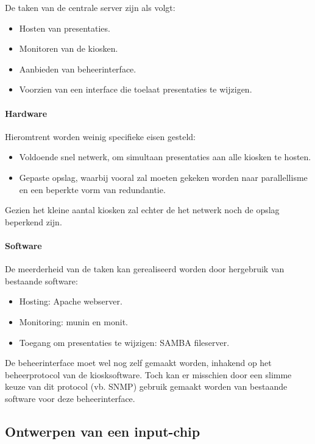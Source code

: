 \documentclass[a4paper,oneside,11pt,final]{memoir}
\begin{document}
De taken van de centrale server zijn als volgt:
\begin{itemize}
	\item Hosten van presentaties.
	\item Monitoren van de kiosken.
	\item Aanbieden van beheerinterface.
	\item Voorzien van een interface die toelaat presentaties te wijzigen.
\end{itemize}

\paragraph{Hardware} Hieromtrent worden weinig specifieke eisen gesteld:
\begin{itemize}
	\item Voldoende snel netwerk, om simultaan presentaties aan alle kiosken te hosten.
	\item Gepaste opslag, waarbij vooral zal moeten gekeken worden naar parallellisme en een beperkte vorm van redundantie.
\end{itemize}

Gezien het kleine aantal kiosken zal echter de het netwerk noch de opslag beperkend zijn.

\paragraph{Software} De meerderheid van de taken kan gerealiseerd worden door hergebruik van bestaande software:
\begin{itemize}
	\item Hosting: Apache webserver.
	\item Monitoring: munin en monit.
	\item Toegang om presentaties te wijzigen: SAMBA fileserver.
\end{itemize}

De beheerinterface moet wel nog zelf gemaakt worden, inhakend op het beheerprotocol van de kiosksoftware. Toch kan er misschien door een slimme keuze van dit protocol (vb. SNMP) gebruik gemaakt worden van bestaande software voor deze beheerinterface.

\subsection{Ontwerpen van een input-chip}
\end{document}
